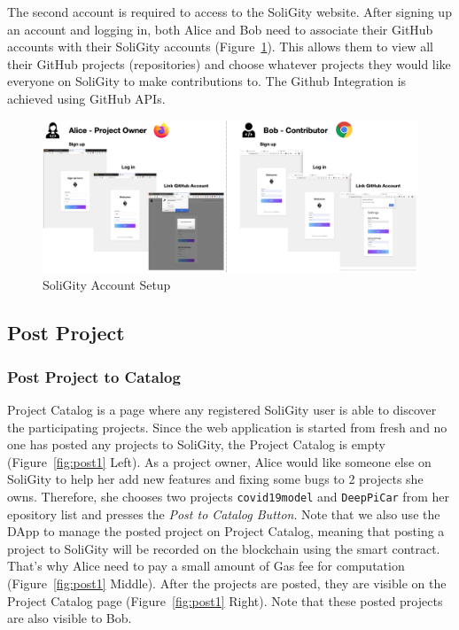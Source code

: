 \documentclass[12pt]{article}
\renewcommand{\_}{\kern-1.5pt\textunderscore\kern-1.5pt}
\begin{document}
The second account is required to access to the SoliGity website. After signing up an account and
logging in, both Alice and Bob need to associate their GitHub accounts with their SoliGity accounts
(Figure~\ref{fig:setup6}). This allows them to view all their GitHub projects (repositories) and
choose whatever projects they would like everyone on SoliGity to make contributions to. The Github
Integration is achieved using GitHub APIs.

\begin{figure}[H]
	\centering
	\includegraphics[width=16cm]{graphs/49. setup_4.png}
	\caption{SoliGity Account Setup}
	\label{fig:setup6}
\end{figure}

\subsection{Post Project}

\subsubsection{Post Project to Catalog}

Project Catalog is a page where any registered SoliGity user is able to discover the participating
projects. Since the web application is started from fresh and no one has posted any projects to
SoliGity, the Project Catalog is empty (Figure~\ref{fig:post1} Left). As a project owner, Alice would
like someone else on SoliGity to help her add new features and fixing some bugs to 2 projects she
owns. Therefore, she chooses two projects \texttt{covid19model} and \texttt{DeepPiCar} from her
epository list and presses the \textit{Post to Catalog Button}. Note that we also use the DApp to
manage the posted project on Project Catalog, meaning that posting a project to SoliGity will be
recorded on the blockchain using the smart contract. That's why Alice need to pay a small amount
of Gas fee for computation (Figure~\ref{fig:post1} Middle). After the projects are posted, they are
visible on the Project Catalog page (Figure~\ref{fig:post1} Right). Note that these posted projects
are also visible to Bob.
\end{document}
